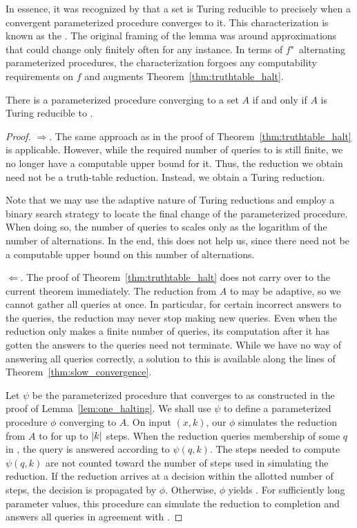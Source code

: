 In essence, it was recognized by \textcite{shoenfield1959degrees} that a set is Turing reducible to  precisely when a convergent parameterized procedure converges to it.
This characterization is known as the  \parencite{odifreddi1992classical,downey2010algorithmic}.
The original framing of the lemma was around approximations that could change only finitely often for any instance.
In terms of $f$"~alternating parameterized procedures, the characterization forgoes any computability requirements on $f$ and augments Theorem~\ref{thm:truthtable_halt}.
\begin{theorem}
\label{thm:turing_halt}%
  There is a parameterized procedure converging to a set $A$ if and only if $A$ is Turing reducible to .
\end{theorem}
\begin{proof}
  $\Longrightarrow$.
  The same approach as in the proof of Theorem~\ref{thm:truthtable_halt} is applicable.
  However, while the required number of queries to  is still finite, we no longer have a computable upper bound for it.
  Thus, the reduction we obtain need not be a truth-table reduction.
  Instead, we obtain a Turing reduction.

  Note that we may use the adaptive nature of Turing reductions and employ a binary search strategy to locate the final change of the parameterized procedure.
  When doing so, the number of queries to  scales only as the logarithm of the number of alternations.
  In the end, this does not help us, since there need not be a computable upper bound on this number of alternations.

  $\Longleftarrow$.
  The proof of Theorem~\ref{thm:truthtable_halt} does not carry over to the current theorem immediately.
  The reduction from $A$ to  may be adaptive, so we cannot gather all queries at once.
  In particular, for certain incorrect answers to the queries, the reduction may never stop making new queries.
  Even when the reduction only makes a finite number of queries, its computation after it has gotten the answers to the queries need not terminate.
  While we have no way of answering all queries correctly, a solution to this is available along the lines of Theorem~\ref{thm:slow_convergence}.

  Let $\psi$ be the parameterized procedure that converges to  as constructed in the proof of Lemma~\ref{lem:one_halting}.
  We shall use $\psi$ to define a parameterized procedure $\phi$ converging to $A$.
  On input $(x, k)$, our $\phi$ simulates the reduction from $A$ to  for up to ${\lvert k\rvert}$ steps.
  When the reduction queries membership of some $q$ in , the query is answered according to $\psi(q, k)$.
  The steps needed to compute $\psi(q, k)$ are not counted toward the number of steps used in simulating the reduction.
  If the reduction arrives at a decision within the allotted number of steps, the decision is propagated by $\phi$.
  Otherwise, $\phi$ yields .
  For sufficiently long parameter values, this procedure can simulate the reduction to completion and answers all queries in agreement with .
\end{proof}

